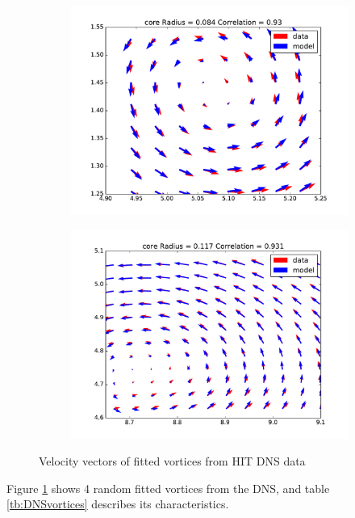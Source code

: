 \documentclass[12pt, a4paper, openany]{memoir}
\begin{document}
\begin{figure}[h!]
\begin{subfigure}[b]{0.45\textwidth}
		\includegraphics[trim=40 20 40 20 ,clip, width=\textwidth]{figure/dns_fit3.pdf}
		\caption{}
	\end{subfigure}
	\begin{subfigure}[b]{0.45\textwidth}
		\centering
		\includegraphics[trim=40 20 40 20 ,clip, width=\textwidth]{figure/dns_fit6.pdf}
		\caption{}
	\end{subfigure}
	\caption{Velocity vectors of fitted vortices from HIT DNS data}
	\label{fig:vorticesDNS}
\end{figure}

Figure \ref{fig:vorticesDNS} shows 4 random fitted vortices from the DNS, and table \ref{tb:DNSvortices} describes its characteristics.
\end{document}
